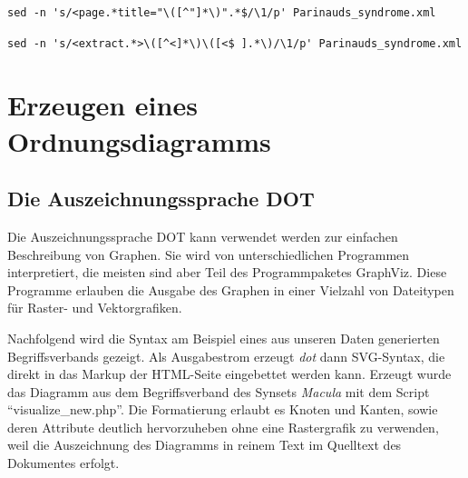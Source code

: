 \documentclass[pagesize,paper=A4,DIV=calc,fontsize=12pt,draft=false]{scrreprt}
\begin{document}
\lstset{
language=bash
}

\begin{lstlisting}[caption={Extraktion des Titels aus Zeile 5 des Artikels \enquote{Parinaud's syndrome}. HTML-Entities wie \texttt{\&\#39;} für hochgestellte einzelne Anführungszeichen in Zeile 5 wurden gesammelt und in der Ergebnisdatei in einem Durchgang ersetzt.}]
sed -n 's/<page.*title="\([^"]*\)".*$/\1/p' Parinauds_syndrome.xml
\end{lstlisting}

\begin{lstlisting}[caption={Extraktion des Textes aus der der Zeile 10 nachfolgenden Zeile des Artikels \enquote{Parinaud's syndrome}}]
sed -n 's/<extract.*>\([^<]*\)\([<$ ].*\)/\1/p' Parinauds_syndrome.xml
\end{lstlisting}




\section{Erzeugen eines Ordnungsdiagramms}

\subsection{Die Auszeichnungssprache DOT}

Die Auszeichnungssprache DOT kann verwendet werden zur einfachen Beschreibung von Graphen.
Sie wird von unterschiedlichen Programmen interpretiert, die meisten sind aber Teil des Programmpaketes GraphViz.
Diese Programme erlauben die Ausgabe des Graphen in einer Vielzahl von Dateitypen für Raster- und Vektorgrafiken.

Nachfolgend wird die Syntax am Beispiel eines aus unseren Daten generierten Begriffsverbands gezeigt.
Als Ausgabestrom erzeugt \emph{dot} dann SVG-Syntax, die direkt in das Markup der HTML-Seite eingebettet werden kann.
Erzeugt wurde das Diagramm aus dem Begriffsverband des Synsets \emph{Macula} mit dem Script \enquote{visualize\_new.php}. 
Die Formatierung erlaubt es Knoten und Kanten, sowie deren Attribute deutlich hervorzuheben ohne eine Rastergrafik zu verwenden, weil die Auszeichnung des Diagramms in reinem Text im Quelltext des Dokumentes erfolgt.
\end{document}

